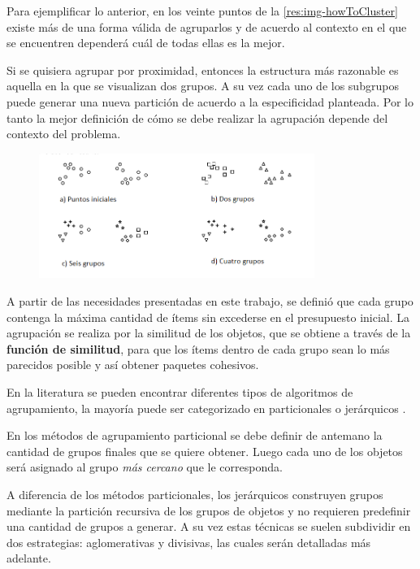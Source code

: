 Para ejemplificar lo anterior, en los veinte puntos de la \autoref{res:img-howToCluster} existe más de una forma válida de agruparlos y de acuerdo al contexto en el que se encuentren dependerá cuál de todas ellas es la mejor.

Si se quisiera agrupar por proximidad, entonces la estructura más razonable es aquella en la que se visualizan dos grupos. A su vez cada uno de los subgrupos puede generar una nueva partición de acuerdo a la especificidad planteada. Por lo tanto la mejor definición de cómo se debe realizar la agrupación depende del contexto del problema.

\begin{figure}[H]
  \centering
   \includegraphics[width=0.8\textwidth]{img/howToCluster.png}
   \caption{}
   \label{res:img-howToCluster}
\end{figure}

A partir de las necesidades presentadas en este trabajo, se definió que cada grupo contenga la máxima cantidad de ítems sin excederse en el presupuesto inicial. La agrupación se realiza por la similitud de los objetos, que se obtiene a través de la \textbf{función de similitud}, para que los ítems dentro de cada grupo sean lo más parecidos posible y así obtener paquetes cohesivos.

En la literatura se pueden encontrar diferentes tipos de algoritmos de agrupamiento, la mayoría puede ser categorizado en particionales o jerárquicos \cite{opac-b1087461}. 

En los métodos de agrupamiento particional se debe definir de antemano la cantidad de grupos finales que se quiere obtener. Luego cada uno de los objetos será asignado al grupo \textit{más cercano} que le corresponda.

A diferencia de los métodos particionales, los jerárquicos construyen grupos mediante la partición recursiva de los grupos de objetos y no requieren predefinir una cantidad de grupos a generar. A su vez estas técnicas se suelen subdividir en dos estrategias: aglomerativas y divisivas, las cuales serán detalladas más adelante.

